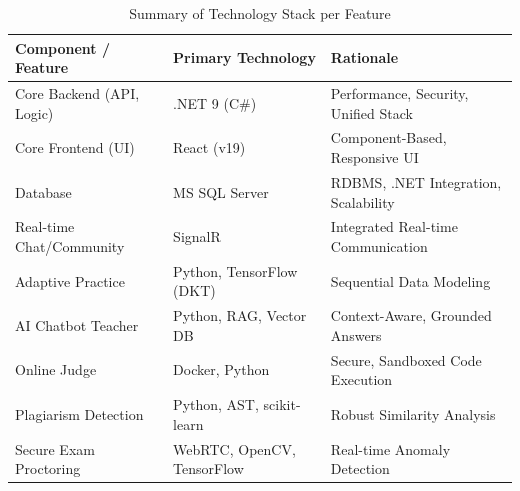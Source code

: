 \begin{table}[H]
\centering
\caption{Summary of Technology Stack per Feature}
\label{tab:tech_stack}
\begin{tabular}{@{}lll@{}}
\toprule
\textbf{Component / Feature} & \textbf{Primary Technology} & \textbf{Rationale} \\
\midrule
Core Backend (API, Logic) & .NET 9 (C\#) & Performance, Security, Unified Stack \\
Core Frontend (UI) & React (v19) & Component-Based, Responsive UI \\
Database & MS SQL Server & RDBMS, .NET Integration, Scalability \\
Real-time Chat/Community & SignalR & Integrated Real-time Communication \\
Adaptive Practice & Python, TensorFlow (DKT) & Sequential Data Modeling \\
AI Chatbot Teacher & Python, RAG, Vector DB & Context-Aware, Grounded Answers \\
Online Judge & Docker, Python & Secure, Sandboxed Code Execution \\
Plagiarism Detection & Python, AST, scikit-learn & Robust Similarity Analysis \\
Secure Exam Proctoring & WebRTC, OpenCV, TensorFlow & Real-time Anomaly Detection \\
\bottomrule
\end{tabular}
\end{table}